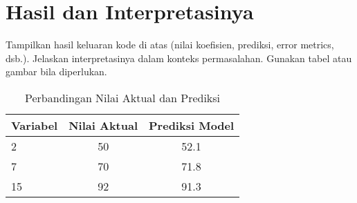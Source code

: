 \documentclass[12pt,a4paper]{article}
\theoremstyle{remark}
\begin{document}
\section{Hasil dan Interpretasinya}
Tampilkan hasil keluaran kode di atas (nilai koefisien, prediksi, error metrics, dsb.).  
Jelaskan interpretasinya dalam konteks permasalahan.  
Gunakan tabel atau gambar bila diperlukan.

\begin{table}[H]
\centering
\begin{tabular}{@{}lcc@{}}
\toprule
Variabel & Nilai Aktual & Prediksi Model \\ \midrule
2  & 50 & 52.1 \\
7  & 70 & 71.8 \\
15 & 92 & 91.3 \\ \bottomrule
\end{tabular}
\caption{Perbandingan Nilai Aktual dan Prediksi}
\end{table}

\printbibliography[title={Referensi}]
\end{document}
